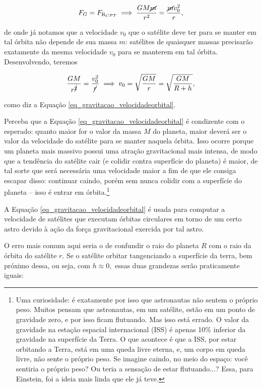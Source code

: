$$ F_G = F_{\text{R}_{CPT}} \implies \dfrac{GM \cancel m}{r^ 2} = \dfrac{\cancel mv_0^2}{ r}, $$

\noindent de onde já notamos que a velocidade $v_0$ que o satélite deve ter para se manter em tal órbita não depende de sua massa $m$: satélites de quaisquer massas precisarão exatamente da mesma velocidade $v_0$ para se manterem em tal órbita. Desenvolvendo, teremos

$$ \dfrac{GM}{r^{\cancel{2}}} = \dfrac{v_0^2}{\cancel{r}} \implies v_0 = \sqrt{\dfrac{GM}{r}} = \sqrt{\dfrac{GM}{R+h}},$$
 
\noindent como diz a Equação \eqref{eq_gravitacao_velocidadeorbital}.

Perceba que a Equação \eqref{eq_gravitacao_velocidadeorbital} é condizente com o esperado: quanto maior for o valor da massa $M$ do planeta, maior deverá ser o valor da velocidade do satélite para se manter naquela órbita. Isso ocorre porque um planeta mais massivo possui uma atração gravitacional mais intensa, de modo que a tendência do satélite cair (e colidir contra superfície do planeta) é maior, de tal sorte que será necessária uma velocidade maior a fim de que ele consiga escapar disso: continuar caindo, porém sem nunca colidir com a superfície do planeta -- isso é entrar em órbita.\footnote{Uma curiosidade: é exatamente por isso que astronautas não sentem o próprio peso. Muitos pensam que astronautas, em um satélite, estão em um ponto de gravidade zero, e por isso ficam flutuando. Mas isso está errado. O valor da gravidade na estação espacial internacional (ISS) é apenas 10\% inferior da gravidade na superfície da Terra. O que acontece é que a ISS, por estar orbitando a Terra, está em uma queda livre eterna, e, um corpo em queda livre, não sente o próprio peso. Se imagine caindo, no meio do espaço: você sentiria o próprio peso? Ou teria a sensação de estar flutuando...? Essa, para Einstein, foi a ideia mais linda que ele já teve.}





A Equação \eqref{eq_gravitacao_velocidadeorbital} é usada para computar a velocidade de satélites que executam órbitas circulares em torno de um certo astro devido à ação da força gravitacional exercida por tal astro.



O erro mais comum aqui seria o de confundir o raio do planeta $R$ com o raio da órbita do satélite $r$. Se o satélite orbitar tangenciando a superfície da terra, bem próximo dessa, ou seja, com $ h \approx 0,$ essas duas grandezas serão praticamente iguais:

